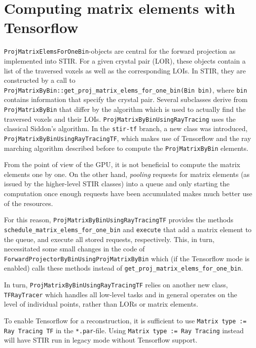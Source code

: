 \documentclass[a4paper, 11pt]{article}
\begin{document}
  \section{Computing matrix elements with Tensorflow}
  \texttt{ProjMatrixElemsForOneBin}-objects are central for the forward projection as implemented into STIR. For a given crystal pair (LOR), these objects contain a list of the traversed voxels as well as the corresponding LOIs. In STIR, they are constructed by a call to \texttt{ProjMatrixByBin::get\_proj\_matrix\-\_elems\_for\_one\_bin(Bin bin)}, where \texttt{bin} contains information that specify the crystal pair.
  Several subclasses derive from \texttt{ProjMatrixByBin} that differ by the algorithm which is used to actually find the traversed voxels and their LOIs. \texttt{ProjMatrixByBinUsingRayTracing} uses the classical Siddon's algorithm. In the \texttt{stir-tf} branch, a new class was introduced, \texttt{ProjMatrixByBinUsingRayTracingTF}, which makes use of Tensorflow and the ray marching algorithm described before to compute the \texttt{ProjMatrixByBin} elements.

  From the point of view of the GPU, it is not beneficial to compute the matrix elements one by one. On the other hand, \textsl{pooling} requests for matrix elements (as issued by the higher-level STIR classes) into a queue and only starting the computation once enough requests have been accumulated makes much better use of the resources.

  For this reason, \texttt{ProjMatrixByBinUsingRayTracingTF} provides the methods \texttt{schedule\_matrix\-\_elems\_for\_one\_bin} and \texttt{execute} that add a matrix element to the queue, and execute all stored requests, respectively. This, in turn, necessitated some small changes in the code of \texttt{ForwardProjector\-ByBinUsingProjMatrixByBin} which (if the Tensorflow mode is enabled) calls these methods instead of \texttt{get\_proj\_matrix\-\_elems\_for\_one\_bin}.

  In turn, \texttt{ProjMatrixByBinUsingRayTracingTF} relies on another new class, \texttt{TFRayTracer} which handles all low-level tasks and in general operates on the level of individual points, rather than LORs or matrix elements.

  To enable Tensorflow for a reconstruction, it is sufficient to use \texttt{Matrix type := Ray Tracing TF} in the \texttt{*.par}-file. Using \texttt{Matrix type := Ray Tracing} instead will have STIR run in legacy mode without Tensorflow support.
\end{document}
